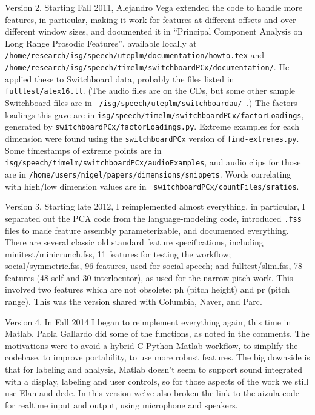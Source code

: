\documentclass[11pt]{article}
\begin{document}
Version 2. Starting Fall 2011, Alejandro Vega extended the code to
handle more features, in particular, making it work for features at
different offsets and over different window sizes, and documented it
in ``Principal Component Analysis on Long Range Prosodic Features'',
available locally at {\tt
  /home/research/isg/speech/uteplm/documentation/howto.tex} and {\tt
  /home/research/isg/speech/timelm/switchboardPCx/documentation/}.  He
applied these to Switchboard data, probably the files listed in {\tt
  fulltest/alex16.tl}.  (The audio files are on the CDs, but some
other sample Switchboard files are in {\tt
  /isg/speech/uteplm/switchboardau/ }.)  The factors loadings this
gave are in {\tt isg/speech/timelm/switchboardPCx/factorLoadings},
generated by {\tt switchboardPCx/factorLoadings.py}.  Extreme examples
for each dimension were found using the {\tt switchboardPCx} version
of {\tt find-extremes.py}.  Some timestamps of extreme points are in
{\tt isg/speech/timelm/switchboardPCx/audioExamples}, and audio clips
for those are in {\tt /home/users/nigel/papers/dimensions/snippets}.
Words correlating with high/low dimension values are in {\tt
  switchboardPCx/countFiles/sratios}.

Version 3. Starting late 2012, I reimplemented almost everything, in
particular, I separated out the PCA code from the language-modeling
code, introduced {\tt .fss} files to made feature assembly
parameterizable, and documented everything.  There are several classic
old standard feature specifications, including
minitest/minicrunch.fss, 11 features for testing the workflow;
social/symmetric.fss, 96 features, used for social speech; and
fulltest/slim.fss, 78 features (48 self and 30 interlocutor), as used
for the narrow-pitch work.  This involved two features which are not
obsolete: ph (pitch height) and pr (pitch range).  This was the
version shared with Columbia, Naver, and Parc.

Version 4.  In Fall 2014 I began to reimplement everything again, this
time in Matlab.  Paola Gallardo did some of the functions, as noted in
the comments.  The motivations were to avoid a hybrid C-Python-Matlab
workflow, to simplify the codebase, to improve portability, to use
more robust features.  The big downside is that for labeling and
analysis, Matlab doesn't seem to support sound integrated with a
display, labeling and user controls, so for those aspects of the work
we still use Elan and dede.  In this version we've also broken the
link to the aizula code for realtime input and output, using
microphone and speakers.
\end{document}
